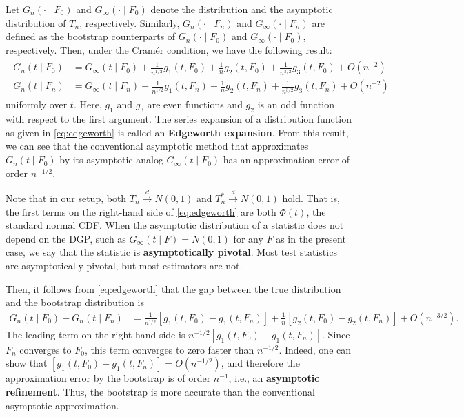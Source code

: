 \documentclass[11pt, A4paper, openany, uplatex]{book}
\begin{document}
Let $G_n(\cdot \mid F_0)$ and $G_\infty(\cdot \mid F_0)$ denote the distribution and the asymptotic distribution of $T_n$, respectively.
Similarly, $G_n(\cdot \mid F_n)$ and $G_\infty(\cdot \mid F_n)$ are defined as the bootstrap counterparts of $G_n(\cdot \mid F_0)$ and $G_\infty(\cdot \mid F_0)$, respectively.
Then, under the Cram\'er condition, we have the following result:
\begin{align}\label{eq:edgeworth}
	\begin{split}
		G_n(t \mid F_0) & = G_\infty(t \mid F_0) + \frac{1}{n^{1/2}} g_1(t, F_0) + \frac{1}{n} g_2(t, F_0) + \frac{1}{n^{3/2}} g_3(t, F_0) + O(n^{-2}) \\
		G_n(t \mid F_n) & = G_\infty(t \mid F_n) + \frac{1}{n^{1/2}} g_1(t, F_n) + \frac{1}{n} g_2(t, F_n) + \frac{1}{n^{3/2}} g_3(t, F_n) + O(n^{-2}) 
	\end{split}
\end{align}
uniformly over $t$.
Here, $g_1$ and $g_3$ are even functions and $g_2$ is an odd function with respect to the first argument.
The series expansion of a distribution function as given in \eqref{eq:edgeworth} is called an \textbf{Edgeworth expansion}.
From this result, we can see that the conventional asymptotic method that approximates $G_n(t \mid F_0)$ by its asymptotic analog $G_\infty(t \mid F_0)$ has an approximation error of order $n^{-1/2}$.

Note that in our setup, both $T_n \overset{d}{\to} N(0,1)$ and $T_n^* \overset{d}{\to} N(0,1)$ hold.
That is, the first terms on the right-hand side of \eqref{eq:edgeworth} are both $\Phi(t)$, the standard normal CDF.
When the asymptotic distribution of a statistic does not depend on the DGP, such as $G_\infty(t \mid F) = N(0,1)$ for any $F$ as in the present case, we say that the statistic is \textbf{asymptotically pivotal}.
Most test statistics are asymptotically pivotal, but most estimators are not.

Then, it follows from \eqref{eq:edgeworth} that the gap between the true distribution and the bootstrap distribution is 
\begin{align*}
	G_n(t \mid F_0) - G_n(t \mid F_n) 
	& = \frac{1}{n^{1/2}}[g_1(t, F_0) - g_1(t, F_n)] + \frac{1}{n}[g_2(t, F_0) - g_2(t, F_n)] + O(n^{-3/2}).
\end{align*}
The leading term on the right-hand side is $n^{-1/2}[g_1(t, F_0) - g_1(t, F_n)]$.
Since $F_n$ converges to $F_0$, this term converges to zero faster than $n^{-1/2}$.
Indeed, one can show that $[g_1(t, F_0) - g_1(t, F_n)] = O(n^{-1/2})$, and therefore the approximation error by the bootstrap is of order $n^{-1}$, i.e., an \textbf{asymptotic refinement}.
Thus, the bootstrap is more accurate than the conventional asymptotic approximation.
\bigskip
\end{document}
